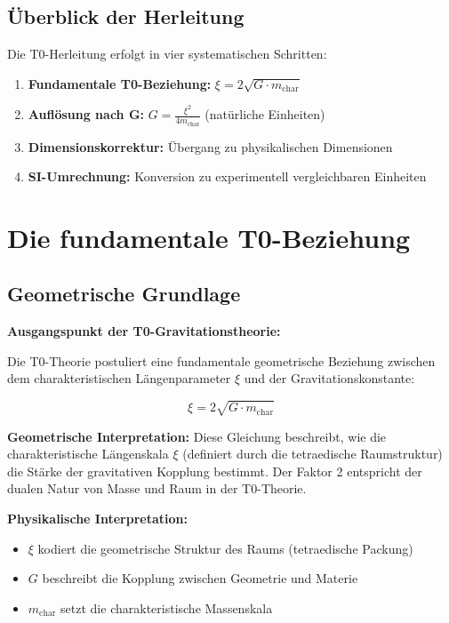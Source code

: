 \documentclass[12pt,a4paper]{article}
\begin{document}
	\subsection{Überblick der Herleitung}
	
	Die T0-Herleitung erfolgt in vier systematischen Schritten:
	
	\begin{enumerate}
		\item \textbf{Fundamentale T0-Beziehung:} $\xi = 2\sqrt{G \cdot m_{\text{char}}}$
		\item \textbf{Auflösung nach G:} $G = \frac{\xi^2}{4m_{\text{char}}}$ (natürliche Einheiten)
		\item \textbf{Dimensionskorrektur:} Übergang zu physikalischen Dimensionen
		\item \textbf{SI-Umrechnung:} Konversion zu experimentell vergleichbaren Einheiten
	\end{enumerate}
	
	\section{Die fundamentale T0-Beziehung}
	
	\subsection{Geometrische Grundlage}
	
	\begin{derivation}
		\textbf{Ausgangspunkt der T0-Gravitationstheorie:}
		
		Die T0-Theorie postuliert eine fundamentale geometrische Beziehung zwischen dem charakteristischen Längenparameter $\xi$ und der Gravitationskonstante:
		
		\begin{equation}
			\xi = 2\sqrt{G \cdot m_{\text{char}}}
			\label{eq:t0_fundamental}
		\end{equation}
		
		\textbf{Geometrische Interpretation:} 
		Diese Gleichung beschreibt, wie die charakteristische Längenskala $\xi$ (definiert durch die tetraedische Raumstruktur) die Stärke der gravitativen Kopplung bestimmt. Der Faktor 2 entspricht der dualen Natur von Masse und Raum in der T0-Theorie.
		
		\textbf{Physikalische Interpretation:}
		\begin{itemize}
			\item $\xi$ kodiert die geometrische Struktur des Raums (tetraedische Packung)
			\item $G$ beschreibt die Kopplung zwischen Geometrie und Materie  
			\item $m_{\text{char}}$ setzt die charakteristische Massenskala
		\end{itemize}
	\end{derivation}
	
\end{document}
